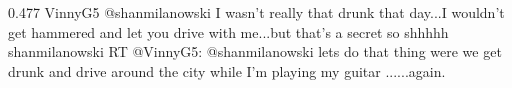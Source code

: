 {0.477}
{\joinNameTweet
{VinnyG5}
{@shanmilanowski I wasn't really that drunk that day...I wouldn't get hammered and let you drive with me...but that's a secret so shhhhh}}
{\joinNameTweet
{shanmilanowski}
{RT @VinnyG5: @shanmilanowski lets do that thing were we get drunk and drive around the city while I'm playing my guitar ......again.}}
%
%
%
%
%
%
%
%
%

